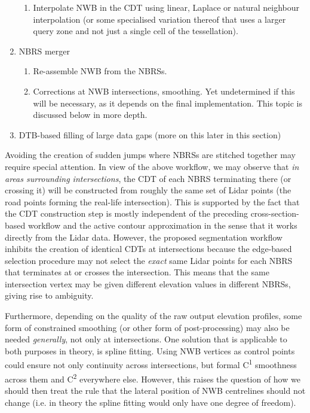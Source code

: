 \begin{enumerate}
\begin{enumerate}
            \item Interpolate NWB in the CDT using linear, Laplace or natural neighbour interpolation (or some specialised variation thereof that uses a larger query zone and not just a single cell of the tessellation).
        \end{enumerate}
    \item NBRS merger
        \begin{enumerate}
            \item Re-assemble NWB from the NBRSs.
            \item Corrections at NWB intersections, smoothing. Yet undetermined if this will be necessary, as it depends on the final implementation. This topic is discussed below in more depth.
        \end{enumerate}
    \item DTB-based filling of large data gaps (more on this later in this section)
\end{enumerate}

Avoiding the creation of sudden jumps where NBRSs are stitched together may require special attention. In view of the above workflow, we may observe that \textit{in areas surrounding intersections}, the CDT of each NBRS terminating there (or crossing it) will be constructed from roughly the same set of Lidar points (the road points forming the real-life intersection). This is supported by the fact that the CDT construction step is mostly independent of the preceding cross-section-based workflow and the active contour approximation in the sense that it works directly from the Lidar data. However, the proposed segmentation workflow inhibits the creation of identical CDTs at intersections because the edge-based selection procedure may not select the \textit{exact} same Lidar points for each NBRS that terminates at or crosses the intersection. This means that the same intersection vertex may be given different elevation values in different NBRSs, giving rise to ambiguity. 

Furthermore, depending on the quality of the raw output elevation profiles, some form of constrained smoothing (or other form of post-processing) may also be needed \textit{generally}, not only at intersections. One solution that is applicable to both purposes in theory, is spline fitting. Using NWB vertices as control points could ensure not only continuity across intersections, but formal C\textsuperscript{1} smoothness across them and C\textsuperscript{2} everywhere else. However, this raises the question of how we should then treat the rule that the lateral position of NWB centrelines should not change (i.e. in theory the spline fitting would only have one degree of freedom).

